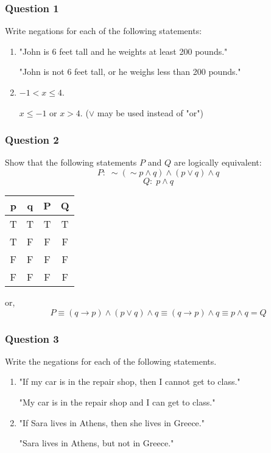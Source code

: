 \documentclass{beamer}
\newcommand{\n}{\sim}
\begin{document}
\begin{frame}
\frametitle{Question 1}
Write negations for each of the following statements:

\begin{enumerate}
\item
"John is 6 feet tall and he weights at least 200 pounds."

\pause
"John is not 6 feet tall, or he weighs less than 200 pounds."

\pause
\item
$-1 < x \leq 4$.

\pause
$x \leq -1$ or $x > 4$. ($\lor$ may be used instead of "or")
\end{enumerate}
\end{frame}

\begin{frame}
\frametitle{Question 2}
Show that the following statements $P$ and $Q$ are logically equivalent:
\[ P : \; \n ( \n p \land q) \land (p \lor q) \land q \]
\[ Q : \; p \land q \]

\pause
\begin{tabular}{cc|c|c}
p & q & P & Q \\
\hline
T & T & T & T \\
T & F & F & F \\
F & F & F & F \\
F & F & F & F
\end{tabular}

or,
\[ P \equiv (q \to p) \land (p \lor q) \land q
     \equiv (q \to p) \land q
     \equiv p \land q = Q \]
\end{frame}

\begin{frame}
\frametitle{Question 3}

Write the negations for each of the following statements.

\begin{enumerate}
\item
"If my car is in the repair shop, then I cannot get to class."

\pause
"My car is in the repair shop and I can get to class."

\pause
\item
"If Sara lives in Athens, then she lives in Greece."

\pause
"Sara lives in Athens, but not in Greece."
\end{enumerate}

\end{frame}
\end{document}

